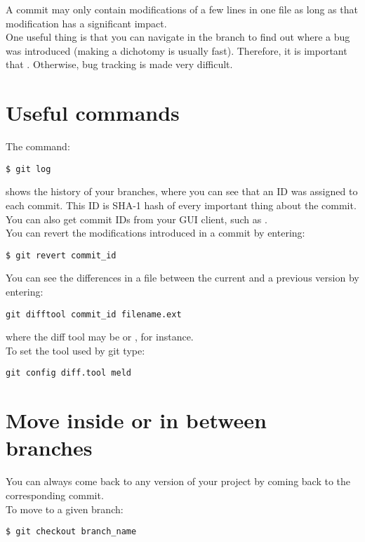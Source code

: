 A commit may only contain modifications of a few lines in one file as long as
that modification has a significant impact.\\

One useful thing is that you can navigate in the branch to find out where a bug
was introduced (making a dichotomy is usually fast). Therefore, it is important
that . Otherwise, bug tracking is made very difficult.

\section{Useful commands}

The command:
\begin{lstlisting}
$ git log
\end{lstlisting}
shows the history of your branches, where you can see that an ID was assigned
to each commit. This ID is SHA-1 hash of every important thing about the
commit. You can also get commit IDs from your GUI client, such as
.\\

You can revert the modifications introduced in a commit by entering:
\begin{lstlisting}
$ git revert commit_id
\end{lstlisting}

You can see the differences in a file between the current and a previous
version by entering:
\begin{lstlisting}
git difftool commit_id filename.ext
\end{lstlisting}
where the diff tool may be  or , for instance.\\

To set the tool used by git type:
\begin{lstlisting}
git config diff.tool meld
\end{lstlisting}

\section{Move inside or in between branches}

You can always come back to any version of your project by coming back to the
corresponding commit.\\

To move to a given branch:
\begin{lstlisting}
$ git checkout branch_name
\end{lstlisting}

